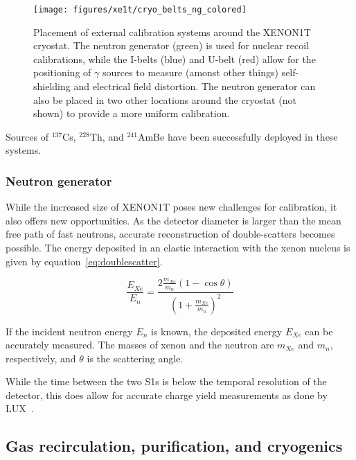 \begin{figure}[htb]
    \begin{center}
    \texttt{[image: figures/xe1t/cryo\_belts\_ng\_colored]}
    \end{center}
    \caption{Placement of external calibration systems around the XENON1T cryostat. The neutron generator (green) is used for nuclear recoil calibrations, while the I-belts (blue) and U-belt (red) allow for the positioning of $\gamma$ sources to measure (amonst other things) self-shielding and electrical field distortion. The neutron generator can also be placed in two other locations around the cryostat (not shown) to provide a more uniform calibration.}\label{fig:belts}
\end{figure}

Sources of $^{137}$Cs, $^{228}$Th, and $^{241}$AmBe have been successfully deployed in these systems.

\subsubsection{Neutron generator}

While the increased size of XENON1T poses new challenges for calibration, it also offers new opportunities. As the detector diameter is larger than the mean free path of fast neutrons, accurate reconstruction of double-scatters becomes possible. The energy deposited in an elastic interaction with the xenon nucleus is given by equation~\eqref{eq:doublescatter}.

\begin{equation}
\frac{E_{Xe}}{E_n} = \frac{2\frac{m_{Xe}}{m_n}(1-\cos\theta)}{\left(1+\frac{m_{Xe}}{m_n}\right)^2}
\label{eq:doublescatter}
\end{equation}

If the incident neutron energy $E_n$ is known, the deposited energy $E_{Xe}$ can be accurately measured. The masses of xenon and the neutron are $m_{Xe}$ and $m_n$, respectively, and $\theta$ is the scattering angle.

While the time between the two S1s is below the temporal resolution of the detector, this does allow for accurate charge yield measurements as done by LUX~\cite{Akerib:2016mzi}.

\subsection{Gas recirculation, purification, and cryogenics}

